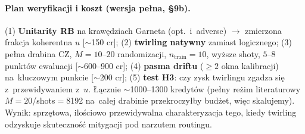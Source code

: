 \documentclass[11pt,a4paper]{article}
\begin{document}
\paragraph{Plan weryfikacji i koszt (wersja pełna, §9b).} (1) \textbf{Unitarity RB} na krawędziach
Garneta (opt.\ i~adverse) $\to$ zmierzona frakcja koherentna $u$ [$\sim$150 cr];
(2) \textbf{twirling natywny} zamiast logicznego; (3) pełna drabina CZ, $M{=}10$--$20$ randomizacji,
$n_{\text{train}}{=}10$, wyższe shoty, $5$--$8$ punktów ewaluacji [$\sim$600--900 cr];
(4) \textbf{pasma driftu} ($\ge 2$ okna kalibracji) na~kluczowym punkcie [$\sim$200 cr];
(5) \textbf{test H3}: czy zysk twirlingu zgadza się z~przewidywaniem z~$u$. Łącznie
$\sim$1000--1300 kredytów (pełny reżim literaturowy $M{=}20$/shots$=$8192 na~całej drabinie
przekroczyłby budżet, więc skalujemy). Wynik: sprzętowa, ilościowo przewidywalna charakteryzacja
tego, kiedy twirling odzyskuje skuteczność mitygacji pod narzutem routingu.
\end{document}

